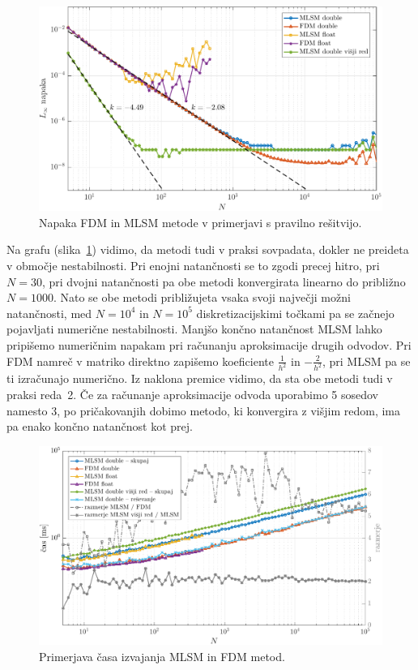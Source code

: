 \documentclass[12pt,a4paper,twoside]{article}
\theoremstyle{definition} %
\theoremstyle{plain} %
\numberwithin{equation}{section}
\newlength{\iw}
\begin{document}
\begin{figure}[h]
  \centering
  \includegraphics[width=\iw]{images/lap1d_convergence.pdf}
  \caption[Napaka FDM in MLSM metode.]{Napaka FDM in MLSM metode v primerjavi s pravilno rešitvijo.}
  \label{fig:mlsm-fdm-err}
\end{figure}

Na grafu (slika~\ref{fig:mlsm-fdm-err}) vidimo, da metodi tudi v praksi sovpadata, dokler ne
preideta v območje nestabilnosti. Pri enojni natančnosti se to zgodi precej hitro, pri $N = 30$, pri
dvojni natančnosti pa obe metodi konvergirata linearno do približno $N = 1000$. Nato se obe metodi
približujeta vsaka svoji največji možni natančnosti, med $N = 10^4$ in $N = 10^5$ diskretizacijskimi
točkami pa se začnejo pojavljati numerične nestabilnosti. Manjšo končno natančnost MLSM lahko
pripišemo numeričnim napakam pri računanju aproksimacije drugih odvodov. Pri FDM namreč v matriko
direktno zapišemo koeficiente $\frac{1}{h^2}$ in $-\frac{2}{h^2}$, pri MLSM pa se ti izračunajo
numerično. Iz naklona premice vidimo, da sta obe metodi tudi v praksi reda~2. Če za računanje
aproksimacije odvoda uporabimo 5 sosedov namesto 3, po pričakovanjih dobimo metodo, ki konvergira z
višjim redom, ima pa enako končno natančnost kot prej.

\begin{figure}[h]
  \centering
  \includegraphics[width=\iw]{images/lap1d_times.pdf}
  \caption{Primerjava časa izvajanja MLSM in FDM metod.}
  \label{fig:mlsm-fdm-time}
\end{figure}
\end{document}
